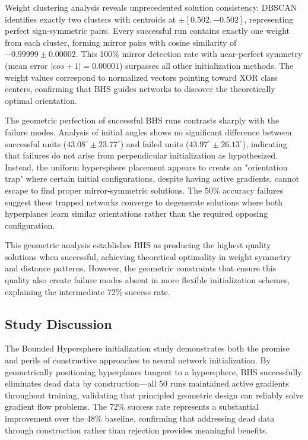 Weight clustering analysis reveals unprecedented solution consistency. DBSCAN identifies exactly two clusters with centroids at $\pm[0.502, -0.502]$, representing perfect sign-symmetric pairs. Every successful run contains exactly one weight from each cluster, forming mirror pairs with cosine similarity of $-0.99999 \pm 0.00002$. This 100\% mirror detection rate with near-perfect symmetry (mean error $|cos + 1| = 0.00001$) surpasses all other initialization methods. The weight values correspond to normalized vectors pointing toward XOR class centers, confirming that BHS guides networks to discover the theoretically optimal orientation.

The geometric perfection of successful BHS runs contrasts sharply with the failure modes. Analysis of initial angles shows no significant difference between successful units ($43.08^\circ \pm 23.77^\circ$) and failed units ($43.97^\circ \pm 26.13^\circ$), indicating that failures do not arise from perpendicular initialization as hypothesized. Instead, the uniform hypersphere placement appears to create an "orientation trap" where certain initial configurations, despite having active gradients, cannot escape to find proper mirror-symmetric solutions. The 50\% accuracy failures suggest these trapped networks converge to degenerate solutions where both hyperplanes learn similar orientations rather than the required opposing configuration.

This geometric analysis establishes BHS as producing the highest quality solutions when successful, achieving theoretical optimality in weight symmetry and distance patterns. However, the geometric constraints that ensure this quality also create failure modes absent in more flexible initialization schemes, explaining the intermediate 72\% success rate.


\subsection*{Study Discussion}

The Bounded Hypersphere initialization study demonstrates both the promise and perils of constructive approaches to neural network initialization. By geometrically positioning hyperplanes tangent to a hypersphere, BHS successfully eliminates dead data by construction—all 50 runs maintained active gradients throughout training, validating that principled geometric design can reliably solve gradient flow problems. The 72\% success rate represents a substantial improvement over the 48\% baseline, confirming that addressing dead data through construction rather than rejection provides meaningful benefits.

